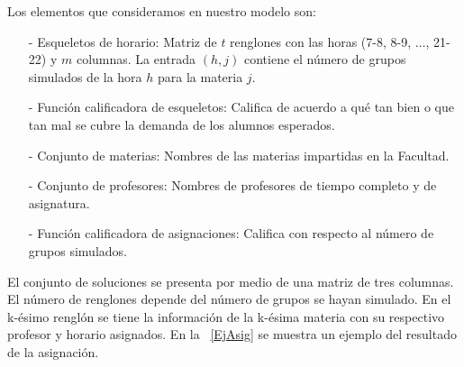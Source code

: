 Los elementos que consideramos en nuestro modelo son:
  
\begin{itemize}
\item[-] Esqueletos de horario: Matriz de $t$ renglones con las horas (7-8, 8-9, $\ldots$, 21-22) y $m$ columnas. La entrada $(h,j)$ contiene el número de grupos simulados de la hora $h$ para la materia $j$.

\item[-] Función calificadora de esqueletos: Califica de acuerdo a qué tan bien o que tan mal se cubre la demanda de los alumnos esperados.

\item[-] Conjunto de materias: Nombres de las materias impartidas en la Facultad.

\item[-] Conjunto de profesores: Nombres de profesores de tiempo completo y de asignatura.

\item[-] Función calificadora de asignaciones: Califica con respecto al número de grupos simulados.
\end{itemize}

El conjunto de soluciones se presenta por medio de una matriz de tres columnas. El número de renglones depende del número de grupos se hayan simulado. En el k-ésimo renglón se tiene la información de la k-ésima materia con su respectivo profesor y horario asignados. En la \tablename{~\ref{EjAsig}} se muestra un ejemplo del resultado de la asignación.

\begin{table}[H]
\centering
{}
\caption[\textit{Ejemplo de asignación}]{\textit{Se muestra un ejemplo de una asignación. La matriz tiene 3 columnas (Materia, Profesor, Horario).}}\label{EjAsig}
\end{table}




